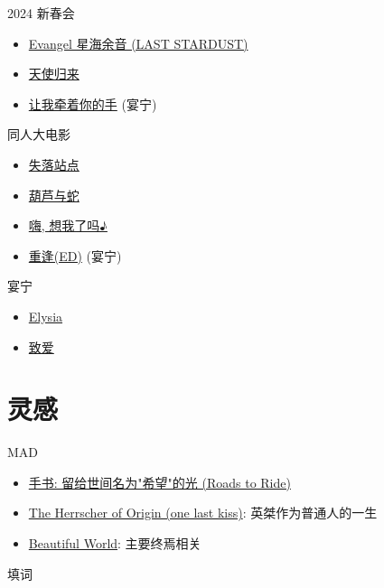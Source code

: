 \documentclass[a4paper]{article}
\begin{document}
2024 新春会

\begin{itemize}
    \item \href{https://www.bilibili.com/video/BV13c411v7DR/}{Evangel 星海余音 (LAST STARDUST)}
    \item \href{https://www.bilibili.com/video/BV1pp4y1m7Uh/}{天使归来}
    \item \href{https://www.bilibili.com/video/BV1te411h7aj/}{让我牵着你的手} (宴宁)
\end{itemize}

同人大电影

\begin{itemize}
    \item \href{https://www.bilibili.com/video/BV1Ud4y1z7mY/?t=309}{失落站点}
    \item \href{https://www.bilibili.com/video/BV1w24y1R7s9/}{葫芦与蛇}
    \item \href{https://www.bilibili.com/video/BV1LD4y117nq/}{嗨, 想我了吗♪}
    \item \href{https://www.bilibili.com/video/BV17D4y117DV/}{重逢(ED)} (宴宁)
\end{itemize}

宴宁

\begin{itemize}
    \item \href{https://www.bilibili.com/video/BV1dq4y1N7ry/}{Elysia}
    \item \href{https://www.bilibili.com/video/BV1bB4y1L7qh/}{致爱}
\end{itemize}

\section{灵感}

MAD

\begin{itemize}
    \item \href{https://www.bilibili.com/video/BV1cG41157Jx/}{手书: 留给世间名为"希望"的光 (Roads to Ride)}
    \item \href{https://www.bilibili.com/video/BV1nV4y1g7ti/}{The Herrscher of Origin (one last kiss)}: 英桀作为普通人的一生
    \item \href{https://www.bilibili.com/video/BV1XX4y1o7yN/}{Beautiful World}: 主要终焉相关
\end{itemize}

填词
\end{document}
